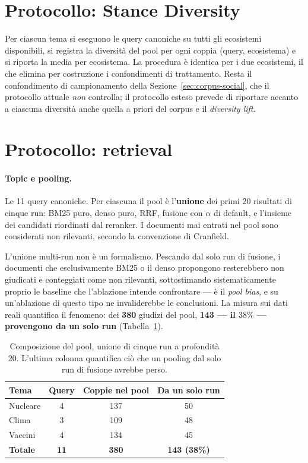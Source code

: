 \documentclass[11pt,a4paper]{report}
\begin{document}
\section{Protocollo: Stance Diversity}\label{sec:proto-div}
Per ciascun tema si eseguono le query canoniche su tutti gli ecosistemi disponibili, si registra la
diversità del pool per ogni coppia (query, ecosistema) e si riporta la media per ecosistema. La
procedura è identica per i due ecosistemi, il che elimina per costruzione i confondimenti di
trattamento. Resta il confondimento di campionamento della Sezione~\ref{sec:corpus-social}, che il
protocollo attuale \emph{non} controlla; il protocollo esteso prevede di riportare accanto a
ciascuna diversità anche quella a priori del corpus e il \emph{diversity lift}.

\section{Protocollo: retrieval}\label{sec:proto-retrieval}
\paragraph{Topic e pooling.} Le 11 query canoniche. Per ciascuna il pool è l'\textbf{unione} dei
primi 20 risultati di cinque run: BM25 puro, denso puro, RRF, fusione con $\alpha$ di default, e
l'insieme dei candidati riordinati dal reranker. I documenti mai entrati nel pool sono considerati
non rilevanti, secondo la convenzione di Cranfield.

L'unione multi-run non è un formalismo. Pescando dal solo run di fusione, i documenti che
esclusivamente BM25 o il denso propongono resterebbero non giudicati e conteggiati come non
rilevanti, sottostimando sistematicamente proprio le baseline che l'ablazione intende confrontare
--- è il \emph{pool bias}, e su un'ablazione di questo tipo ne invaliderebbe le conclusioni. La
misura sui dati reali quantifica il fenomeno: dei \textbf{380} giudizi del pool, \textbf{143 --- il
$38\%$ --- provengono da un solo run} (Tabella~\ref{tab:pool}).

\begin{table}[t]
\centering
\small
\begin{tabular}{lccc}
\toprule
\textbf{Tema} & \textbf{Query} & \textbf{Coppie nel pool} & \textbf{Da un solo run} \\
\midrule
Nucleare & 4 & 137 & 50 \\
Clima & 3 & 109 & 48 \\
Vaccini & 4 & 134 & 45 \\
\midrule
\textbf{Totale} & \textbf{11} & \textbf{380} & \textbf{143 (38\%)} \\
\bottomrule
\end{tabular}
\caption{Composizione del pool, unione di cinque run a profondità 20. L'ultima colonna quantifica
ciò che un pooling dal solo run di fusione avrebbe perso.}
\label{tab:pool}
\end{table}
\end{document}
